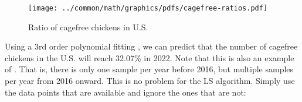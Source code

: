 \begin{figure}
  \centering
  \texttt{[image: ../common/math/graphics/pdfs/cagefree-ratios.pdf]}
  \caption{Ratio of cagefree chickens in U.S. \label{fig:cagefree}}
\end{figure}
\begin{minipage}{\tw-95mm}
\begin{example}
\footnotemark
\label{ex:cagefree}
Using a 3rd order polynomial fitting ,
we can predict that the number of cagefree chickens
in the U.S. will reach 32.07\% in 2022.
Note that this is also an example of .
That is, there is only one sample per year before 2016, but multiple samples per year
from 2016 onward.
This is no problem for the LS algorithm. Simply use the data points that are available 
and ignore the ones that are not:
\end{example}
\end{minipage}
%
\hfill{}
\\

